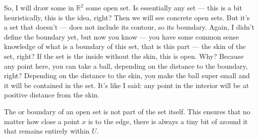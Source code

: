\begin{spoken-clean}[00:05:52 - 00:07:10]
So, I will draw some in $\mathbb{R}^2$ some open set. Is essentially any set --- this is a bit heuristically, this is the idea, right? Then we will see concrete open sets. But it's a set that doesn't --- does not include its contour, so its boundary. Again, I didn't define the boundary yet, but now you know --- you have some common sense knowledge of what is a boundary of this set, that is this part --- the skin of the set, right? If the set is the inside without the skin, this is open. Why? Because any point here, you can take a ball, depending on the distance to the boundary, right? Depending on the distance to the skin, you make the ball super small and it will be contained in the set. It's like I said: any point in the interior will be at positive distance from the skin.
\end{spoken-clean}

\begin{math-stroke}
\begin{center}
\end{center}
\begin{explanation-of-steps}
The  or boundary of an open set is not part of the set itself. This ensures that no matter how close a point $x$ is to the edge, there is always a tiny bit of  around it that remains entirely within $U$.
\end{explanation-of-steps}
\end{math-stroke}

